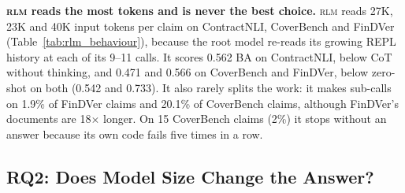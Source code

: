\documentclass[11pt]{article}
\begin{document}
\noindent \textbf{\textsc{rlm} reads the most tokens and is never the best
choice.} \textsc{rlm} reads 27K, 23K and 40K input tokens per claim on
ContractNLI, CoverBench and FinDVer (Table~\ref{tab:rlm_behaviour}),
because the root model re-reads its growing REPL history at each of its
9--11 calls. It scores 0.562 BA on ContractNLI, below CoT without thinking,
and 0.471 and 0.566 on CoverBench and FinDVer, below zero-shot on both
(0.542 and 0.733). It also rarely splits the work: it makes sub-calls on
1.9\% of FinDVer claims and 20.1\% of CoverBench claims, although FinDVer's
documents are 18$\times$ longer. On 15 CoverBench claims (2\%) it stops
without an answer because its own code fails five times in a row.

\subsection{RQ2: Does Model Size Change the Answer?}
\label{sec:rq2}
\label{sec:scaling}
\end{document}
